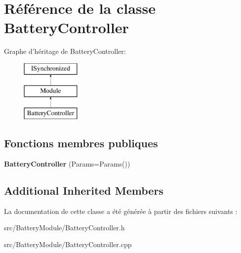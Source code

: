 \hypertarget{classBatteryController}{\section{Référence de la classe Battery\-Controller}
\label{classBatteryController}
}
Graphe d'héritage de Battery\-Controller\-:\begin{figure}[H]
\begin{center}
\leavevmode
\includegraphics[height=3.000000cm]{classBatteryController}
\end{center}
\end{figure}
\subsection*{Fonctions membres publiques}
\begin{DoxyCompactItemize}
\item 
\hypertarget{classBatteryController_a48f46e2aa8ffb576634cdcb0ae172227}{{\bfseries Battery\-Controller} (Params=Params())}\label{classBatteryController_a48f46e2aa8ffb576634cdcb0ae172227}

\end{DoxyCompactItemize}
\subsection*{Additional Inherited Members}


La documentation de cette classe a été générée à partir des fichiers suivants \-:\begin{DoxyCompactItemize}
\item 
src/\-Battery\-Module/Battery\-Controller.\-h\item 
src/\-Battery\-Module/Battery\-Controller.\-cpp\end{DoxyCompactItemize}
